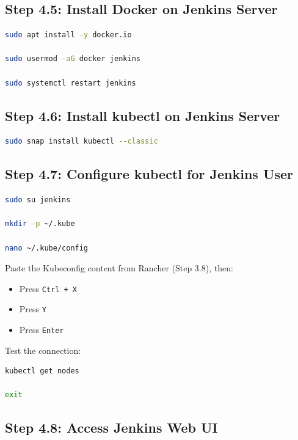 \documentclass[12pt,a4paper]{article}
\begin{document}
\subsection{Step 4.5: Install Docker on Jenkins Server}

\begin{lstlisting}[language=bash]
sudo apt install -y docker.io

sudo usermod -aG docker jenkins

sudo systemctl restart jenkins
\end{lstlisting}

\subsection{Step 4.6: Install kubectl on Jenkins Server}

\begin{lstlisting}[language=bash]
sudo snap install kubectl --classic
\end{lstlisting}

\subsection{Step 4.7: Configure kubectl for Jenkins User}

\begin{lstlisting}[language=bash]
sudo su jenkins

mkdir -p ~/.kube

nano ~/.kube/config
\end{lstlisting}

Paste the Kubeconfig content from Rancher (Step 3.8), then:
\begin{itemize}
    \item Press \texttt{Ctrl + X}
    \item Press \texttt{Y}
    \item Press \texttt{Enter}
\end{itemize}

Test the connection:

\begin{lstlisting}[language=bash]
kubectl get nodes

exit
\end{lstlisting}

\subsection{Step 4.8: Access Jenkins Web UI}
\end{document}
